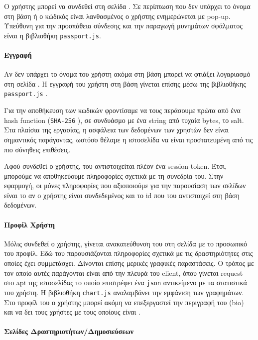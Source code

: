 \documentclass[nonacm, language=english, language=greek]{acmart}
\newcommand{\en}[1]{\textlatin{#1}}
\newcommand{\src}[1]{\texttt{\en{#1}}}
\begin{document}
Ο χρήστης μπορεί να συνδεθεί στη σελίδα \say{\en{Login}}. Σε περίπτωση που δεν
υπάρχει το όνομα στη βάση ή ο κώδικός είναι λανθασμένος ο χρήστης ενημερώνεται
με \en{pop-up}. Υπεύθυνη για την προσπάθεια σύνδεσης και την παραγωγή μυνημάτων
σφάλματος είναι η βιβλιοθήκη \src{passport.js}. 

\paragraph{Εγγραφή}

Αν δεν υπάρχει το όνομα του χρήστη ακόμα στη βάση μπορεί να φτιάξει λογαριασμό
στη σελίδα \say{\en{Register}}. Η εγγραφή του χρήστη στη βάση γίνεται επίσης
μέσω της βιβλιοθήκης \src{passport.js} \cite{Passport}.

Για την αποθήκευση των κωδικών φροντίσαμε να τους περάσουμε πρώτα από 
ένα \en{hash function} (\src{SHA-256} \cite{SHA256}), σε συνδυάσμο 
με ένα \en{string} από τυχαία \en{bytes}, το \en{salt}.
Στα πλαίσια της εργασίας, η ασφάλεια των δεδομένων των χρηστών δεν είναι 
σημαντικός παράγοντας, ωστόσο θέλαμε η ιστοσελίδα να είναι προστατευμένη 
από τις πιο σύνηθεις επιθέσεις.

Αφού συνδεθεί ο χρήστης, του αντιστοιχείται πλέον ένα \en{session-token}. Έτσι,
μπορούμε να αποθηκεύουμε πληροφορίες σχετικά με τη συνεδρία του. Στην εφαρμογή,
οι μόνες πληροφορίες που αξιοποιούμε για την παρουσίαση των σελίδων είναι το αν
ο χρήστης είναι συνδεδεμένος και το \en{id} που του αντιστοιχεί στη βάση
δεδομένων.

\paragraph{Προφίλ Χρήστη}

Μόλις συνδεθεί ο χρήστης, γίνεται ανακατεύθυνση του 
στη σελίδα με το προσωπικό του προφίλ. Εδώ του 
παρουσιάζονται πληροφορίες σχετικά με τις δραστηριότητες 
στις οποίες έχει συμμετάσχει. 
Δίνονται επίσης μερικές γραφικές παραστάσεις. Ο τρόπος με τον οποίο 
αυτές παράγονται είναι από την πλευρά του \en{client}, όπου γίνεται 
\en{request} στο \en{api} της ιστοσελίδας το οποίο επιστρέφει 
ένα \src{json} αντικείμενο με τα στατιστικά του χρήστη. 
Η βιβλιοθήκη \src{chart.js} \cite{ChartJS}
αναλαμβάνει την εμφάνιση των γραφημάτων.
Στο προφίλ του ο χρήστης μπορεί ακόμη να επεξεργαστεί την περιγραφή του 
(\en{bio}) και να δει τους χρήστες με τους οποίους είναι .

\paragraph{Σελίδες Δραστηριοτήτων/Δημοσιεύσεων}
\end{document}
